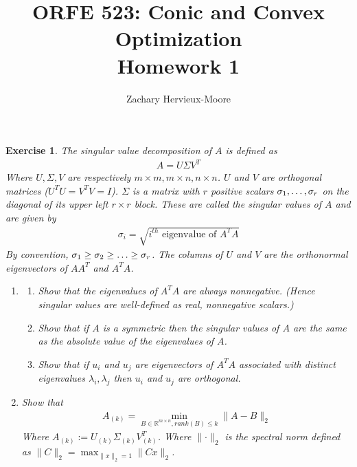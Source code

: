 \documentclass[12pt]{article}
\title{ORFE 523: Conic and Convex Optimization \\ Homework 1}
\author{Zachary Hervieux-Moore}
\date{\displaydate{date}}
\theoremstyle{colon}
\newtheorem{exercise}{Exercise}
\begin{document}
\maketitle

\clearpage

\begin{exercise}
  The singular value decomposition of $A$ is defined as
  \begin{gather*}
    A = U \Sigma V^T
  \end{gather*}
  Where $U, \Sigma, V$ are respectively $m \times m, m \times n, n \times n$. $U$ and $V$ are orthogonal matrices ($U^T U = V^T V = I$). $\Sigma$ is a matrix with $r$ positive scalars $\sigma_1, \mathellipsis, \sigma_r$ on the diagonal of its upper left $r \times r$ block. These are called the \textit{singular values} of $A$ and are given by
  \begin{gather*}
    \sigma_i = \sqrt{i^{th} \text{ eigenvalue of } A^T A}
  \end{gather*}
  By convention, $\sigma_1 \geq \sigma_2 \geq \mathellipsis \geq \sigma_r$. The columns of $U$ and $V$ are the orthonormal eigenvectors of $A A^T$ and $A^T A$.

  \begin{enumerate}[label=\arabic*)]
    \item
      \begin{enumerate}[label=\alph*)]
        \item Show that the eigenvalues of $A^T A$ are always nonnegative. (Hence singular values are well-defined as real, nonnegative scalars.)
        \item Show that if $A$ is a symmetric then the singular values of $A$ are the same as the absolute value of the eigenvalues of $A$.
        \item Show that if $u_i$ and $u_j$ are eigenvectors of $A^T A$ associated with distinct eigenvalues $\lambda_i, \lambda_j$ then $u_i$ and $u_j$ are orthogonal.
      \end{enumerate}

    \item Show that
      \begin{gather*}
        A_{(k)} = \min_{B \in \mathbb{R}^{m \times n}, rank(B) \leq k} \lVert A - B \rVert_2
      \end{gather*}
      Where $A_{(k)} := U_{(k)} \Sigma_{(k)} V_{(k)}^T$. Where $\lVert \cdot \rVert_2$ is the spectral norm defined as $\lVert C \rVert_2 = \max_{\lVert x \rVert_2 = 1} \lVert C x \rVert_2$.


\end{enumerate}
\end{exercise}
\end{document}
